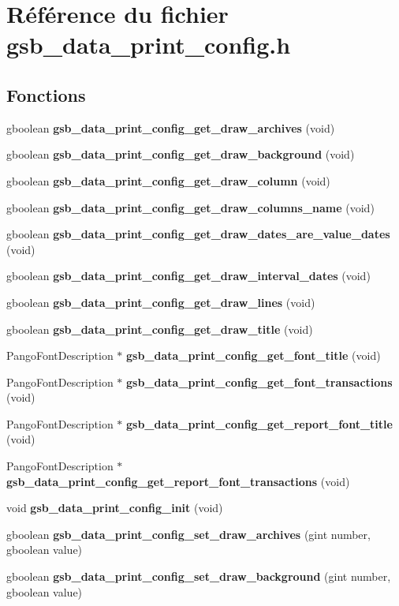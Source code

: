 \section{Référence du fichier gsb\_\-data\_\-print\_\-config.h}
\label{gsb__data__print__config_8h}
\subsection*{Fonctions}
\begin{DoxyCompactItemize}
\item 
gboolean {\bf gsb\_\-data\_\-print\_\-config\_\-get\_\-draw\_\-archives} (void)
\item 
gboolean {\bf gsb\_\-data\_\-print\_\-config\_\-get\_\-draw\_\-background} (void)
\item 
gboolean {\bf gsb\_\-data\_\-print\_\-config\_\-get\_\-draw\_\-column} (void)
\item 
gboolean {\bf gsb\_\-data\_\-print\_\-config\_\-get\_\-draw\_\-columns\_\-name} (void)
\item 
gboolean {\bf gsb\_\-data\_\-print\_\-config\_\-get\_\-draw\_\-dates\_\-are\_\-value\_\-dates} (void)
\item 
gboolean {\bf gsb\_\-data\_\-print\_\-config\_\-get\_\-draw\_\-interval\_\-dates} (void)
\item 
gboolean {\bf gsb\_\-data\_\-print\_\-config\_\-get\_\-draw\_\-lines} (void)
\item 
gboolean {\bf gsb\_\-data\_\-print\_\-config\_\-get\_\-draw\_\-title} (void)
\item 
PangoFontDescription $\ast$ {\bf gsb\_\-data\_\-print\_\-config\_\-get\_\-font\_\-title} (void)
\item 
PangoFontDescription $\ast$ {\bf gsb\_\-data\_\-print\_\-config\_\-get\_\-font\_\-transactions} (void)
\item 
PangoFontDescription $\ast$ {\bf gsb\_\-data\_\-print\_\-config\_\-get\_\-report\_\-font\_\-title} (void)
\item 
PangoFontDescription $\ast$ {\bf gsb\_\-data\_\-print\_\-config\_\-get\_\-report\_\-font\_\-transactions} (void)
\item 
void {\bf gsb\_\-data\_\-print\_\-config\_\-init} (void)
\item 
gboolean {\bf gsb\_\-data\_\-print\_\-config\_\-set\_\-draw\_\-archives} (gint number, gboolean value)
\item 
gboolean {\bf gsb\_\-data\_\-print\_\-config\_\-set\_\-draw\_\-background} (gint number, gboolean value)

\end{DoxyCompactItemize}
